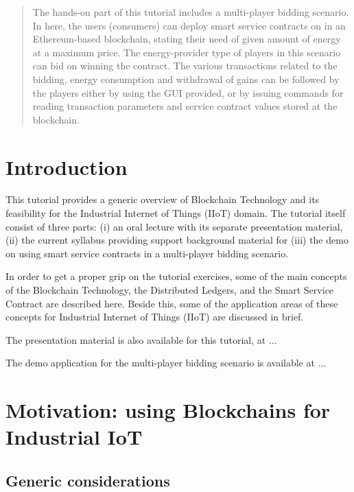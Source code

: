 \documentclass[a4paper]{article}
\begin{document}
\begin{abstract}
The hands-on part of this tutorial includes a multi-player bidding scenario.  In here, the users (consumers) can deploy smart service contracts on in an Ethereum-based blockchain, stating their need of given amount of energy at a maximum price. The energy-provider type of players in this scenario can bid on winning the contract. The various transactions related to the bidding, energy consumption and withdrawal of gains can be followed by the players either by using the GUI provided, or by issuing commands for reading transaction parameters and service contract values stored at the blockchain.

\end{abstract}

\newpage

\tableofcontents


\section{Introduction}

This tutorial provides a generic overview of Blockchain Technology and its feasibility for the  Industrial Internet of Things (IIoT) domain. The tutorial itself consist of three parts: (i) an oral lecture with its separate presentation material, (ii) the current syllabus providing support background material for (iii) the demo on using smart service contracts in a multi-player bidding scenario.

In order to get a proper grip on the tutorial exercises, some of the main concepts of the Blockchain Technology, the Distributed Ledgers, and the Smart Service Contract are described here.
Beside this, some of the application areas of these concepts for Industrial Internet of Things (IIoT) are discussed in brief.

The presentation material is also available for this tutorial, at ...

The demo application for the multi-player bidding scenario is available at ...


\section{Motivation: using Blockchains for Industrial IoT}

\subsection{Generic considerations}
\end{document}

